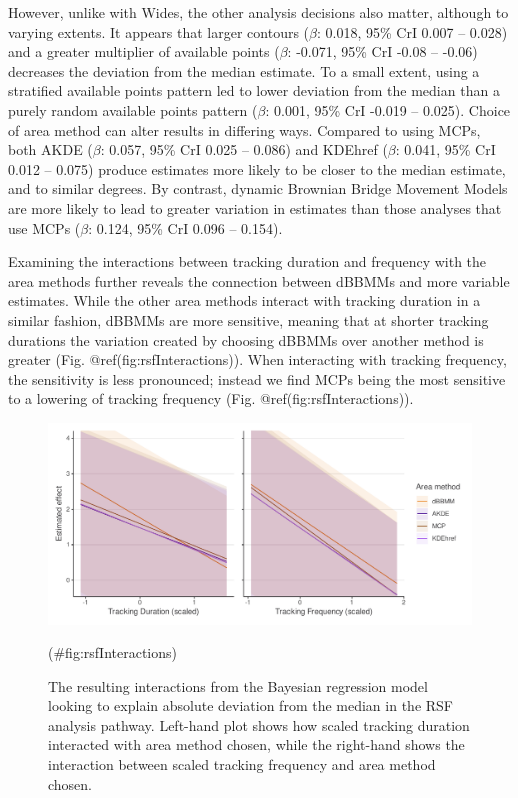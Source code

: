 \documentclass[10pt,a4paper]{article}
\begin{document}
However, unlike with Wides, the other analysis decisions also matter, although to varying extents.
It appears that larger contours (\(\beta\): 0.018, 95\% CrI 0.007 -- 0.028) and a greater multiplier of available points (\(\beta\): -0.071, 95\% CrI -0.08 -- -0.06) decreases the deviation from the median estimate.
To a small extent, using a stratified available points pattern led to lower deviation from the median than a purely random available points pattern (\(\beta\): 0.001, 95\% CrI -0.019 -- 0.025).
Choice of area method can alter results in differing ways.
Compared to using MCPs, both AKDE (\(\beta\): 0.057, 95\% CrI 0.025 -- 0.086) and KDEhref (\(\beta\): 0.041, 95\% CrI 0.012 -- 0.075) produce estimates more likely to be closer to the median estimate, and to similar degrees.
By contrast, dynamic Brownian Bridge Movement Models are more likely to lead to greater variation in estimates than those analyses that use MCPs (\(\beta\): 0.124, 95\% CrI 0.096 -- 0.154).

Examining the interactions between tracking duration and frequency with the area methods further reveals the connection between dBBMMs and more variable estimates.
While the other area methods interact with tracking duration in a similar fashion, dBBMMs are more sensitive, meaning that at shorter tracking durations the variation created by choosing dBBMMs over another method is greater (Fig. @ref(fig:rsfInteractions)).
When interacting with tracking frequency, the sensitivity is less pronounced; instead we find MCPs being the most sensitive to a lowering of tracking frequency (Fig. @ref(fig:rsfInteractions)).

\begin{figure}
\includegraphics[width=1\linewidth]{../figures/rsfEffectPlot_iteractions} \caption{The resulting interactions from the Bayesian regression model looking to explain absolute deviation from the median in the RSF analysis pathway. Left-hand plot shows how scaled tracking duration interacted with area method chosen, while the right-hand shows the interaction between scaled tracking frequency and area method chosen.}(\#fig:rsfInteractions)
\end{figure}
\end{document}
